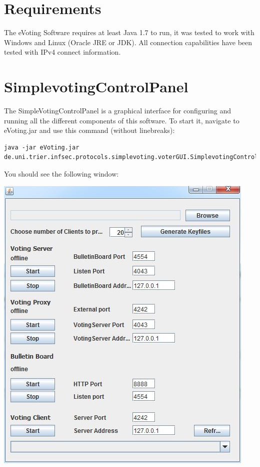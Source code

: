 \documentclass{article}
\begin{document}
\tableofcontents
\newpage

\section{Requirements}
The eVoting Software requires at least Java 1.7 to run, it was tested to work with Windows and Linux (Oracle JRE or JDK). All connection capabilities have been tested with IPv4 connect information.

\section{SimplevotingControlPanel}
The SimpleVotingControlPanel is a graphical interface for configuring and running all the different components of this software. To start it, navigate to eVoting.jar and use this command (without linebreaks):
\begin{lstlisting}
java -jar eVoting.jar 
de.uni.trier.infsec.protocols.simplevoting.voterGUI.SimplevotingControlPanel
\end{lstlisting}
You should see the following window:\\
\begin{center}
\includegraphics{./controlpanel.jpg}
\end{center}
\end{document}
